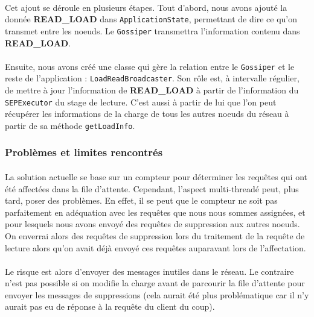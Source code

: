 \documentclass[12pt]{article}
\newcommand{\class}[1]{\texttt{#1}}
\begin{document}
\paragraph{}Cet ajout se déroule en plusieurs étapes. Tout d'abord, nous avons ajouté la donnée \textbf{READ\_LOAD} dans \class{ApplicationState}, permettant de dire ce qu'on transmet entre les noeuds. Le \class{Gossiper} transmettra l'information contenu dans \textbf{READ\_LOAD}.

\paragraph{}Ensuite, nous avons créé une classe qui gère la relation entre le \class{Gossiper} et le reste de l'application : \class{LoadReadBroadcaster}. Son rôle est, à intervalle régulier, de mettre à jour l'information de \textbf{READ\_LOAD} à partir de l'information du \class{SEPExecutor} du stage de lecture. C'est aussi à partir de lui que l'on peut récupérer les informations de la charge de tous les autres noeuds du réseau à partir de sa méthode \texttt{getLoadInfo}.

\subsubsection*{Problèmes et limites rencontrés}

\paragraph{}La solution actuelle se base sur un compteur pour déterminer les requêtes qui ont été affectées dans la file d'attente. Cependant, l'aspect multi-threadé peut, plus tard, poser des problèmes. En effet, il se peut que le compteur ne soit pas parfaitement en adéquation avec les requêtes que nous nous sommes assignées, et pour lesquels nous avons envoyé des requêtes de suppression aux autres noeuds. On enverrai alors des requêtes de suppression lors du traitement de la requête de lecture alors qu'on avait déjà envoyé ces requêtes auparavant lors de l'affectation.

\paragraph{}Le risque est alors d'envoyer des messages inutiles dans le réseau. Le contraire n'est pas possible si on modifie la charge avant de parcourir la file d'attente pour envoyer les messages de suppressions (cela aurait été plus problématique car il n'y aurait pas eu de réponse à la requête du client du coup).
\end{document}
